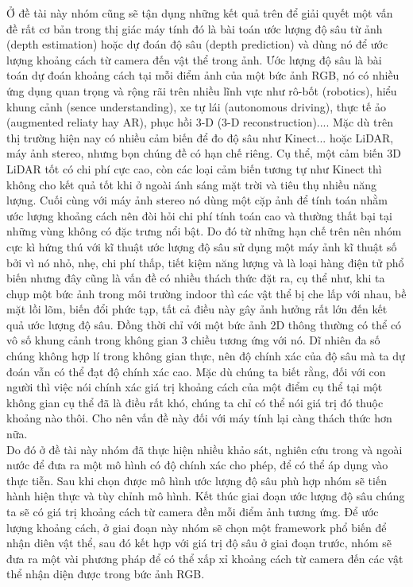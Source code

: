 Ở đề tài này nhóm cũng sẽ tận dụng những kết quả trên để giải quyết một vấn đề rất cơ bản trong thị giác máy tính đó là bài toán ước lượng độ sâu từ ảnh (depth estimation) hoặc dự đoán độ sâu (depth prediction) và dùng nó để ước lượng khoảng cách từ camera đến vật thể trong ảnh. Ước lượng độ sâu là bài toán dự đoán khoảng cách tại mỗi điểm ảnh của một bức ảnh RGB, nó có nhiều ứng dụng quan trọng và rộng rãi trên nhiều lĩnh vực như rô-bốt (robotics), hiểu khung cảnh (sence understanding), xe tự lái (autonomous driving), thực tế ảo (augmented reliaty hay AR), phục hồi 3-D (3-D reconstruction).... Mặc dù trên thị trường hiện nay có nhiều cảm biến để đo độ sâu như Kinect... hoặc LiDAR, máy ảnh stereo, nhưng bọn chúng đề có hạn chế riêng. Cụ thể, một cảm biến 3D LiDAR tốt có chi phí cực cao, còn các loại cảm biến tương tự như Kinect thì không cho kết quả tốt khi ở ngoài ánh sáng mặt trời và tiêu thụ nhiều năng lượng. Cuối cùng với máy ảnh stereo nó dùng một cặp ảnh để tính toán nhằm ước lượng khoảng cách nên đòi hỏi chi phí tính toán cao và thường thất bại tại những vùng không có đặc trưng nổi bật. Do đó từ những hạn chế trên nên nhóm cực kì hứng thú với kĩ thuật ước lượng độ sâu sử dụng một máy ảnh kĩ thuật số bởi vì nó nhỏ, nhẹ, chi phí thấp, tiết kiệm năng lượng và là loại hàng điện tử phổ biến nhưng đây cũng là vấn đề có nhiều thách thức đặt ra, cụ thể  như, khi ta chụp một bức ảnh trong môi trường indoor thì các vật thể bị che lấp với nhau, bề mặt lồi lõm, biến đổi phức tạp, tất cả điều này gây ảnh hưởng rất lớn đến kết quả ước lượng độ sâu. Đồng thời chỉ với một bức ảnh 2D thông thường có thể có vô số khung cảnh trong không gian 3 chiều tương ứng với nó. Dĩ nhiên đa số chúng không hợp lí trong không gian thực, nên độ chính xác của độ sâu mà ta dự đoán vẫn có thể đạt độ chính xác cao. Mặc dù chúng ta biết rằng, đối với con người thì việc nói chính xác giá trị khoảng cách của một điểm cụ thể tại một không gian cụ thể đã là điều rất khó, chúng ta chỉ có thể  nói giá trị đó thuộc khoảng nào thôi. Cho nên vấn đề này đối với máy tính lại càng thách thức hơn nữa.\\

Do đó ở đề tài này nhóm đã thực hiện nhiều khảo sát, nghiên cứu trong và ngoài nước để đưa ra một mô hình có độ chính xác cho phép, để có thể áp dụng vào thực tiễn. Sau khi chọn được mô hình ước lượng độ sâu phù hợp nhóm sẽ tiến hành hiện thực và tùy chỉnh mô hình. Kết thúc giai đoạn ước lượng độ sâu chúng ta sẽ có giá trị khoảng cách từ camera đền mỗi điểm ảnh tương ứng. Để ước lượng khoảng cách, ở giai đoạn này nhóm sẽ chọn một framework phổ biến để nhận diên vật thể, sau đó kết hợp với giá trị độ sâu ở giai đoạn trước, nhóm sẽ đưa ra một vài phương pháp để có thể xấp xỉ khoảng cách từ camera đến các vật thể nhận diện được trong bức ảnh RGB.\\

